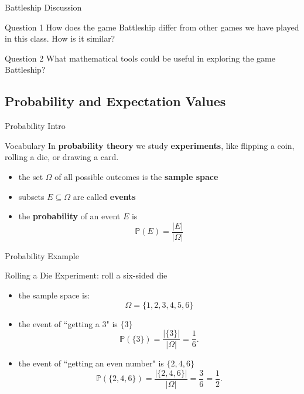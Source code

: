 \documentclass{beamer}
\begin{document}
\begin{frame}{Battleship Discussion}
\pause
  \begin{block}{Question 1}
    How does the game Battleship differ from other games we have played in this class.
    How is it similar?
  \end{block}
\pause
  \begin{block}{Question 2}
    What mathematical tools could be useful in exploring the game Battleship?
  \end{block}
\end{frame}

\subsection{Probability and Expectation Values}

\begin{frame}{Probability Intro}
  \begin{block}{Vocabulary}
    In \textbf{probability theory} we study \textbf{experiments}, like flipping a coin, rolling a die, or drawing a card.\\
    \begin{itemize}
\pause
      \item the set $\Omega$ of all possible outcomes is the \textbf{sample space}
\pause
      \item subsets $E\subseteq \Omega$ are called \textbf{events}
\pause
      \item the \textbf{probability} of an event $E$ is
      $$\mathbb{P}(E) = \frac{|E|}{|\Omega|}$$
    \end{itemize}
  \end{block}
\end{frame}

\begin{frame}{Probability Example}
  \begin{block}{Rolling a Die}
    Experiment: roll a six-sided die
    \begin{itemize}
\pause
      \item the sample space is:
      $$\Omega = \{1,2,3,4,5,6\}$$
      \item the event of ``getting a 3" is $\{3\}$
      {\small $$\mathbb{P}(\{3\}) = \frac{|\{3\}|}{|\Omega|} = \frac{1}{6}.$$}
\pause
      \item the event of ``getting an even number" is $\{2,4,6\}$
      {\small $$\mathbb{P}(\{2,4,6\}) = \frac{|\{2,4,6\}|}{|\Omega|} = \frac{3}{6} = \frac{1}{2}.$$}
    \end{itemize}
  \end{block}
\end{frame}
\end{document}
